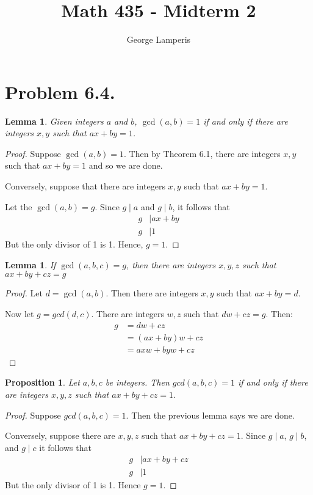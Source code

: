 \documentclass[letterpaper, 12pt, oneside]{memoir}
\title{Math 435 - Midterm 2}
\author{George Lamperis}
\date{}
\theoremstyle{mystyle}
\newtheorem{prop}[thm]{Proposition}
\newtheorem{lemma}[thm]{Lemma}
\begin{document}
\maketitle

\section{Problem 6.4.}

\begin{lemma}
    Given integers $a$ and $b$, $\gcd(a,b) = 1$ if and only if there are
    integers $x, y$ such that $ax + by = 1$.
\end{lemma}
\begin{proof}
    Suppose $\gcd(a,b) = 1$. Then by Theorem 6.1, there are integers $x,y$ such
    that $ax+by=1$ and so we are done.
    
    Conversely, suppose that there are integers $x,y$ such that $ax+by=1$. 
    
    Let the $\gcd(a,b)=g$. Since $g \mid a$ and $g \mid b$, it follows that
    \begin{align*}
        g & \mid ax+by \\
        g & \mid 1
    \end{align*}
    But the only divisor of 1 is 1. Hence, $g=1$.
\end{proof}
    
\begin{lemma}
    If $\gcd(a,b,c) = g$, then there are integers $x,y,z$ such that 
    $ax + by + cz = g$
\end{lemma}
\begin{proof}
    Let $d=\gcd(a,b)$. Then there are integers $x,y$ such that $ax+by=d$.
    
    Now let $g=gcd(d,c)$. There are integers $w,z$ such that $dw+cz=g$. Then:
    \begin{align*}
        g &= dw + cz \\
          &= (ax+by)w + cz \\
          &= axw + byw + cz
    \end{align*}
\end{proof}

\begin{prop}
    Let $a,b,c$ be integers. Then $gcd(a,b,c) = 1$ if and only if there are
    integers $x,y,z$ such that $ax+by+cz=1$.
\end{prop}
\begin{proof}
    Suppose $gcd(a,b,c) = 1$. Then the previous lemma says we are done.
    
    Conversely, suppose there are $x,y,z$ such that $ax+by+cz=1$. Since 
    $g \mid a$, $g \mid b$, and $g \mid c$ it follows that
    \begin{align*}
        g & \mid ax+by+cz \\
        g & \mid 1
    \end{align*}
    But the only divisor of 1 is 1. Hence $g=1$.
\end{proof}
\end{document}
